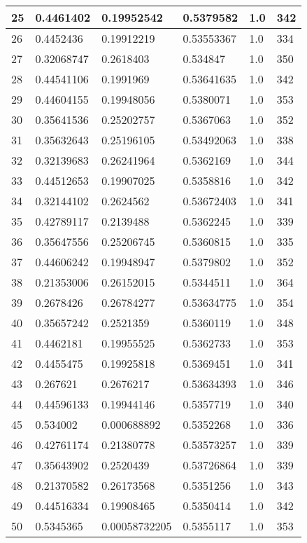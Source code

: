 \begin{longtable}{|l|l|l|l|l|l|}
25 & 0.4461402 & 0.19952542 & 0.5379582 & 1.0 & 342 \\ \hline 
26 & 0.4452436 & 0.19912219 & 0.53553367 & 1.0 & 334 \\ \hline 
27 & 0.32068747 & 0.2618403 & 0.534847 & 1.0 & 350 \\ \hline 
28 & 0.44541106 & 0.1991969 & 0.53641635 & 1.0 & 342 \\ \hline 
29 & 0.44604155 & 0.19948056 & 0.5380071 & 1.0 & 353 \\ \hline 
30 & 0.35641536 & 0.25202757 & 0.5367063 & 1.0 & 352 \\ \hline 
31 & 0.35632643 & 0.25196105 & 0.53492063 & 1.0 & 338 \\ \hline 
32 & 0.32139683 & 0.26241964 & 0.5362169 & 1.0 & 344 \\ \hline 
33 & 0.44512653 & 0.19907025 & 0.5358816 & 1.0 & 342 \\ \hline 
34 & 0.32144102 & 0.2624562 & 0.53672403 & 1.0 & 341 \\ \hline 
35 & 0.42789117 & 0.2139488 & 0.5362245 & 1.0 & 339 \\ \hline 
36 & 0.35647556 & 0.25206745 & 0.5360815 & 1.0 & 335 \\ \hline 
37 & 0.44606242 & 0.19948947 & 0.5379802 & 1.0 & 352 \\ \hline 
38 & 0.21353006 & 0.26152015 & 0.5344511 & 1.0 & 364 \\ \hline 
39 & 0.2678426 & 0.26784277 & 0.53634775 & 1.0 & 354 \\ \hline 
40 & 0.35657242 & 0.2521359 & 0.5360119 & 1.0 & 348 \\ \hline 
41 & 0.4462181 & 0.19955525 & 0.5362733 & 1.0 & 353 \\ \hline 
42 & 0.4455475 & 0.19925818 & 0.5369451 & 1.0 & 341 \\ \hline 
43 & 0.267621 & 0.2676217 & 0.53634393 & 1.0 & 346 \\ \hline 
44 & 0.44596133 & 0.19944146 & 0.5357719 & 1.0 & 340 \\ \hline 
45 & 0.534002 & 0.000688892 & 0.5352268 & 1.0 & 336 \\ \hline 
46 & 0.42761174 & 0.21380778 & 0.53573257 & 1.0 & 339 \\ \hline 
47 & 0.35643902 & 0.2520439 & 0.53726864 & 1.0 & 339 \\ \hline 
48 & 0.21370582 & 0.26173568 & 0.5351256 & 1.0 & 343 \\ \hline 
49 & 0.44516334 & 0.19908465 & 0.5350414 & 1.0 & 342 \\ \hline 
50 & 0.5345365 & 0.00058732205 & 0.5355117 & 1.0 & 353 \\ \hline 
\end{longtable}
